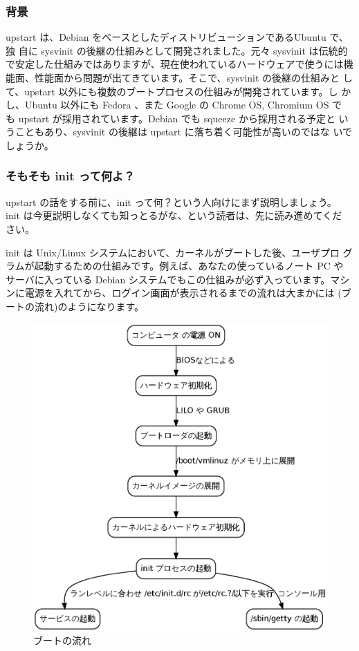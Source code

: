 \documentclass[mingoth,a4paper]{jsarticle}
\begin{document}
\subsubsection{背景}

upstart は、Debian をベースとしたディストリビューションであるUbuntu で、独
自に sysvinit の後継の仕組みとして開発されました。元々 sysvinit は伝統的
で安定した仕組みではありますが、現在使われているハードウェアで使うには機
能面、性能面から問題が出てきています。そこで、sysvinit の後継の仕組みと
して、upstart 以外にも複数のブートプロセスの仕組みが開発されています。し
かし、Ubuntu 以外にも Fedora 、また Google の Chrome OS, Chromium OS で
も upstart が採用されています。Debian でも squeeze から採用される予定と
いうこともあり、sysvinit の後継は upstart に落ち着く可能性が高いのではな
いでしょうか。

\subsubsection{そもそも init って何よ？}

upstart の話をする前に、init って何？という人向けにまず説明しましょう。
init は今更説明しなくても知っとるがな、という読者は、先に読み進めてくだ
さい。

init は Unix/Linux システムにおいて、カーネルがブートした後、ユーザプロ
グラムが起動するための仕組みです。例えば、あなたの使っているノート PC や
サーバに入っている Debian システムでもこの仕組みが必ず入っています。マシ
ンに電源を入れてから、ログイン画面が表示されるまでの流れは大まかには
(ブートの流れ)のようになります。

\begin{figure}[H]
\begin{center}
\includegraphics[height=0.5\hsize]{image201002/sysvinit.eps}
\caption{ブートの流れ}
\label{fig:upstart-sysvinit-bootimage}
\end{center}
\end{figure}
\end{document}

